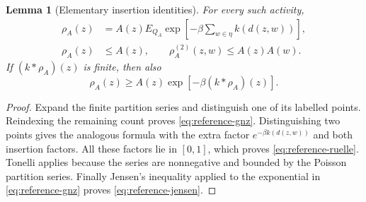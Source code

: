 \documentclass[11pt]{article}
\newtheorem{lemma}[theorem]{Lemma}
\theoremstyle{remark}\newtheorem{remark}[theorem]{Remark}
\begin{document}
\begin{lemma}[Elementary insertion identities]
\label{lem:reference-insertion}
For every such activity,
\begin{align}
 \rho_A(z)&=A(z)E_{Q_A}\exp\!\left[-\beta\sum_{w\in\eta}k(d(z,w))\right],
 \label{eq:reference-gnz}\\
 \rho_A(z)&\le A(z),\qquad
 \rho_A^{(2)}(z,w)\le A(z)A(w).
 \label{eq:reference-ruelle}
\end{align}
If $(k*\rho_A)(z)$ is finite, then also
\begin{equation}\label{eq:reference-jensen}
 \rho_A(z)\ge A(z)\exp[-\beta(k*\rho_A)(z)].
\end{equation}
\end{lemma}
\begin{proof}
Expand the finite partition series and distinguish one of its labelled
points.  Reindexing the remaining count proves
\eqref{eq:reference-gnz}.  Distinguishing two points gives the analogous
formula with the extra factor $e^{-\beta k(d(z,w))}$ and both
insertion factors.  All these factors lie in $[0,1]$, which proves
\eqref{eq:reference-ruelle}.  Tonelli applies because the series are
nonnegative and bounded by the Poisson partition series.  Finally
Jensen's inequality applied to the exponential in
\eqref{eq:reference-gnz} proves \eqref{eq:reference-jensen}.
\end{proof}
\end{document}
